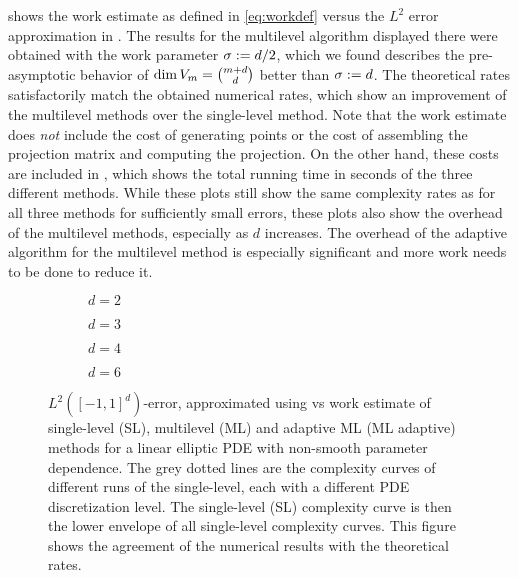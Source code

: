  shows the work estimate as defined in
\cref{eq:workdef} versus the $L^2$ error approximation in
. The results for the multilevel algorithm displayed there were obtained with the work parameter $\sigma:=d/2$, which we found describes the pre-asymptotic behavior of $\dim V_{m}=\binom{m+d}{d}$ better than $\sigma:=d$. The theoretical rates
satisfactorily match the obtained numerical rates, which show an
improvement of the multilevel methods over the single-level method. Note
that the work estimate does \emph{not} include the cost of generating
points or the cost of assembling the projection matrix and computing
the projection. On the other hand, these costs are included in
, which shows the total running time in seconds of the
three different methods. While these plots still show the same
complexity rates as  for all three methods for
sufficiently small errors, these plots also show the overhead of the
multilevel methods, especially as $d$ increases. The overhead of the
adaptive algorithm for the multilevel method is especially significant
and more work needs to be done to reduce it.

\setlength\figureheight{7.4cm}
\setlength\figurewidth{8.2cm}
\providecommand{\figlabel}{fig:}

\begin{figure}
	\centering
	\begin{subfigure}{0.49\textwidth}
      \renewcommand{\figlabel}{fig:work-est-vs-error-d2}
      
      \caption{$d=2$}
	\end{subfigure}
	\begin{subfigure}{0.5\textwidth}
      \renewcommand{\figlabel}{fig:work-est-vs-error-d3}
      
      \caption{$d=3$}
	\end{subfigure}
	\begin{subfigure}{0.49\textwidth}
      \renewcommand{\figlabel}{fig:work-est-vs-error-d4}
      
      \caption{$d=4$}
	\end{subfigure}
	\begin{subfigure}{0.5\textwidth}
      \renewcommand{\figlabel}{fig:work-est-vs-error-d6}
      
      \caption{$d=6$}
	\end{subfigure}
	\caption{$L^2([-1,1]^d)$-error, approximated using
       vs work estimate  of
      single-level (SL), multilevel (ML) and adaptive ML (ML adaptive)
      methods for a linear elliptic PDE with non-smooth parameter
      dependence. The grey dotted lines are the complexity curves of
      different runs of the single-level, each with a different PDE
      discretization level. The single-level (SL) complexity curve is
      then the lower envelope of all single-level complexity
      curves. This figure shows the agreement of the numerical results
      with the theoretical rates.}
	\label{fig:kink-work}
  \end{figure}


